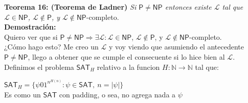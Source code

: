 \documentclass{article}
\begin{document}
\begin{flushleft}
  \textbf{Teorema 16: \hypertarget{ladner}{\textcolor{Bittersweet}{(Teorema de Ladner)}}} 
  \textit{Si $\mathsf{P} \neq \mathsf{NP}$ entonces existe $\mathcal{L}$ tal que $\mathcal{L} \in \mathsf{NP}$,
  $\mathcal{L} \not\in \mathsf{P}$, y $\mathcal{L} \not\in \mathsf{NP}$}-completo. \\[0.5em]

  \textbf{\textcolor{Mulberry}{Demostración:}} \\[0.5em]
  
  Quiero ver que si $\mathsf{P} \neq \mathsf{NP} \Rightarrow \exists \mathcal{L} : \mathcal{L} \in \mathsf{NP}$,
  $\mathcal{L} \not\in \mathsf{P}$, y $\mathcal{L} \not\in \mathsf{NP}$-completo. \\[0.5em]

  \textcolor{Mulberry}{¿Cómo hago esto? }Me creo un $\mathcal{L}$ y voy viendo que asumiendo el antecedente $\mathsf{P} \neq 
  \mathsf{NP}$, llego a obtener que se cumple el consecuente si lo hice bien al $\mathcal{L}$. \\[0.5em]

  Definimos el problema $\mathsf{SAT}_H$ relativo a la funcion $H : \mathbb{N} \rightarrow \mathbb{N}$ tal
  que:
\end{flushleft}
\begin{center}
  $\mathsf{SAT}_H = \{ \psi 01^{n^{H(n)}} : \psi \in \mathsf{SAT}, \ n = |\psi|\}$ \\[0.5em]
  
  \textcolor{OliveGreen}{Es como un $\mathsf{SAT}$ con padding, o sea, no agrega nada a $\psi$}
\end{center}
\end{document}
